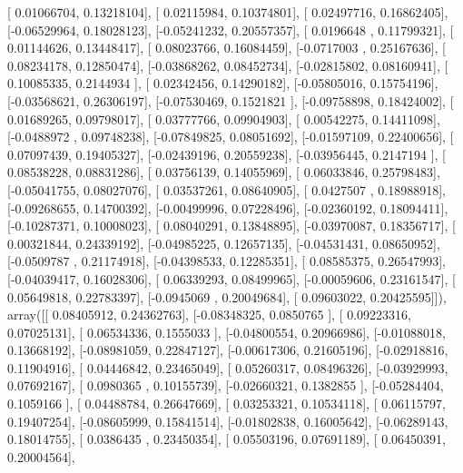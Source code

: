 \documentclass{article}
\begin{document}
       [ 0.01066704,  0.13218104],
       [ 0.02115984,  0.10374801],
       [ 0.02497716,  0.16862405],
       [-0.06529964,  0.18028123],
       [-0.05241232,  0.20557357],
       [ 0.0196648 ,  0.11799321],
       [ 0.01144626,  0.13448417],
       [ 0.08023766,  0.16084459],
       [-0.0717003 ,  0.25167636],
       [ 0.08234178,  0.12850474],
       [-0.03868262,  0.08452734],
       [-0.02815802,  0.08160941],
       [ 0.10085335,  0.2144934 ],
       [ 0.02342456,  0.14290182],
       [-0.05805016,  0.15754196],
       [-0.03568621,  0.26306197],
       [-0.07530469,  0.1521821 ],
       [-0.09758898,  0.18424002],
       [ 0.01689265,  0.09798017],
       [ 0.03777766,  0.09904903],
       [ 0.00542275,  0.14411098],
       [-0.0488972 ,  0.09748238],
       [-0.07849825,  0.08051692],
       [-0.01597109,  0.22400656],
       [ 0.07097439,  0.19405327],
       [-0.02439196,  0.20559238],
       [-0.03956445,  0.2147194 ],
       [ 0.08538228,  0.08831286],
       [ 0.03756139,  0.14055969],
       [ 0.06033846,  0.25798483],
       [-0.05041755,  0.08027076],
       [ 0.03537261,  0.08640905],
       [ 0.0427507 ,  0.18988918],
       [-0.09268655,  0.14700392],
       [-0.00499996,  0.07228496],
       [-0.02360192,  0.18094411],
       [-0.10287371,  0.10008023],
       [ 0.08040291,  0.13848895],
       [-0.03970087,  0.18356717],
       [ 0.00321844,  0.24339192],
       [-0.04985225,  0.12657135],
       [-0.04531431,  0.08650952],
       [-0.0509787 ,  0.21174918],
       [-0.04398533,  0.12285351],
       [ 0.08585375,  0.26547993],
       [-0.04039417,  0.16028306],
       [ 0.06339293,  0.08499965],
       [-0.00059606,  0.23161547],
       [ 0.05649818,  0.22783397],
       [-0.0945069 ,  0.20049684],
       [ 0.09603022,  0.20425595]]), array([[ 0.08405912,  0.24362763],
       [-0.08348325,  0.0850765 ],
       [ 0.09223316,  0.07025131],
       [ 0.06534336,  0.1555033 ],
       [-0.04800554,  0.20966986],
       [-0.01088018,  0.13668192],
       [-0.08981059,  0.22847127],
       [-0.00617306,  0.21605196],
       [-0.02918816,  0.11904916],
       [ 0.04446842,  0.23465049],
       [ 0.05260317,  0.08496326],
       [-0.03929993,  0.07692167],
       [ 0.0980365 ,  0.10155739],
       [-0.02660321,  0.1382855 ],
       [-0.05284404,  0.1059166 ],
       [ 0.04488784,  0.26647669],
       [ 0.03253321,  0.10534118],
       [ 0.06115797,  0.19407254],
       [-0.08605999,  0.15841514],
       [-0.01802838,  0.16005642],
       [-0.06289143,  0.18014755],
       [ 0.0386435 ,  0.23450354],
       [ 0.05503196,  0.07691189],
       [ 0.06450391,  0.20004564],
\end{document}
